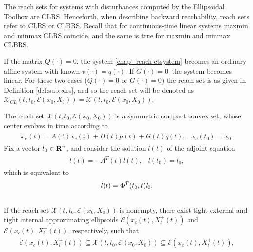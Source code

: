 \documentclass[letterpaper,10pt,english]{sphinxmanual}
\begin{document}
The reach sets for systems with disturbances computed by the Ellipsoidal
Toolbox are CLRS. Henceforth, when describing backward reachability,
reach sets refer to CLRS or CLBRS. Recall that for continuous-time
linear systems maxmin and minmax CLRS coincide, and the same is true for
maxmin and minmax CLBRS.

If the matrix $Q(\cdot)=0$, the system \eqref{chap_reach-ctsystem} becomes an
ordinary affine system with known $v(\cdot)=q(\cdot)$. If
$G(\cdot) = 0$, the system becomes linear. For these two cases
($Q(\cdot)=0$ or $G(\cdot)=0$) the reach set is as given in
Definition {[}def:sub:\emph{o}lrs{]}, and so the reach set will be denoted as
${\mathcal X}_{CL}(t, t_0, {\mathcal E}(x_0, X_0)) = {\mathcal X}(t, t_0, {\mathcal E}(x_0,X_0))$.

The reach set ${\mathcal X}(t,t_0,{\mathcal E}(x_0,X_0))$ is a
symmetric compact convex set, whose center evolves in time according to
\label{chap_reach:equation-fwdcenter}\begin{gather}
\begin{split}\dot{x}_c(t) = A(t)x_c(t) + B(t)p(t) + G(t)q(t), \;\;\;
x_c(t_0)=x_0.\end{split}\label{chap_reach-fwdcenter}
\end{gather}
Fix a vector $l_0\in{\bf R}^n$, and consider the solution
$l(t)$ of the adjoint equation
\label{chap_reach:equation-adjointct}\begin{gather}
\begin{split}\dot{l}(t) = -A^T(t)l(t), \;\;\; l(t_0) = l_0,\end{split}\label{chap_reach-adjointct}
\end{gather}
which is equivalent to
\begin{gather}
\begin{split}l(t) = \Phi^T(t_0, t)l_0.\end{split}\notag\\\begin{split}\end{split}\notag
\end{gather}
If the reach set ${\mathcal X}(t, t_0, {\mathcal E}(x_0,X_0))$ is
nonempty, there exist tight external and tight internal approximating
ellipsoids ${\mathcal E}(x_c(t), X^+_l(t))$ and
${\mathcal E}(x_c(t), X^-_l(t))$, respectively, such that
\label{chap_reach:equation-fwdinclusion}\begin{gather}
\begin{split}{\mathcal E}(x_c(t), X^-_l(t))\subseteq{\mathcal X}(t,t_0,{\mathcal E}(x_0,X_0))
\subseteq {\mathcal E}(x_c(t), X^+_l(t)),\end{split}\label{chap_reach-fwdinclusion}
\end{gather}
\end{document}
